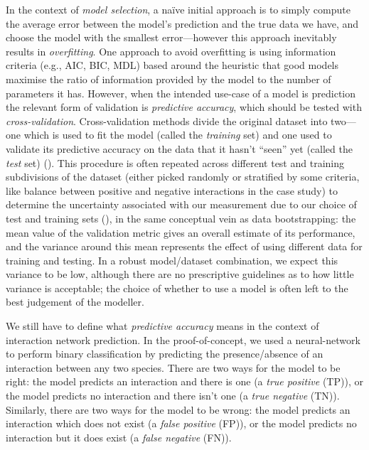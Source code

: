 \begin{refsection}
In the context of \emph{model selection}, a naïve initial approach is to
simply compute the average error between the model's prediction and the
true data we have, and choose the model with the smallest
error---however this approach inevitably results in \emph{overfitting}.
One approach to avoid overfitting is using information criteria (e.g.,
AIC, BIC, MDL) based around the heuristic that good models maximise the
ratio of information provided by the model to the number of parameters
it has. However, when the intended use-case of a model is prediction the
relevant form of validation is \emph{predictive accuracy}, which should
be tested with \emph{cross-validation}. Cross-validation methods divide
the original dataset into two---one which is used to fit the model
(called the \emph{training} set) and one used to validate its predictive
accuracy on the data that it hasn't ``seen'' yet (called the \emph{test}
set) (\cite{Bishop2006PatRec}). This procedure is often repeated across
different test and training subdivisions of the dataset (either picked
randomly or stratified by some criteria, like balance between positive
and negative interactions in the case study) to determine the
uncertainty associated with our measurement due to our choice of test
and training sets (\cite{Arlot2010SurCro}), in the same conceptual vein as
data bootstrapping: the mean value of the validation metric gives an
overall estimate of its performance, and the variance around this mean
represents the effect of using different data for training and testing.
In a robust model/dataset combination, we expect this variance to be
low, although there are no prescriptive guidelines as to how little
variance is acceptable; the choice of whether to use a model is often
left to the best judgement of the modeller.

We still have to define what \emph{predictive accuracy} means in the
context of interaction network prediction. In the proof-of-concept, we
used a neural-network to perform binary classification by predicting the
presence/absence of an interaction between any two species. There are
two ways for the model to be right: the model predicts an interaction
and there is one (a \emph{true positive} (TP)), or the model predicts no
interaction and there isn't one (a \emph{true negative} (TN)).
Similarly, there are two ways for the model to be wrong: the model
predicts an interaction which does not exist (a \emph{false positive}
(FP)), or the model predicts no interaction but it does exist (a
\emph{false negative} (FN)).


\end{refsection}
